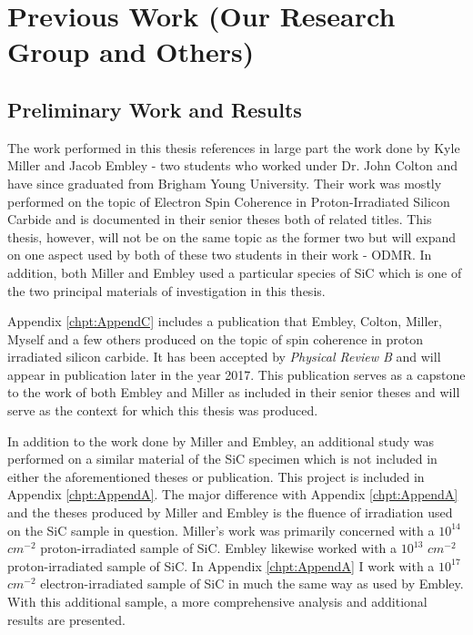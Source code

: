 \documentclass[oneside, astronomy, noacknowlegments]{BYUPhys}
\begin{document}
\section{Previous Work (Our Research Group and Others)}

\subsection{Preliminary Work and Results}

The work performed in this thesis references in large part the work done by Kyle Miller and Jacob Embley - two students who worked under Dr. John Colton and have since graduated from Brigham Young University. Their work was mostly performed on the topic of Electron Spin Coherence in Proton-Irradiated Silicon Carbide and is documented in their senior theses both of related titles. This thesis, however, will not be on the same topic as the former two but will expand on one aspect used by both of these two students in their work - ODMR. In addition, both Miller and Embley used a particular species of SiC which is one of the two principal materials of investigation in this thesis.

Appendix \ref{chpt:AppendC} includes a publication that Embley, Colton, Miller, Myself and a few others produced on the topic of spin coherence in proton irradiated silicon carbide. It has been accepted by \textit{Physical Review B} and will appear in publication later in the year 2017. This publication serves as a capstone to the work of both Embley and Miller as included in their senior theses and will serve as the context for which this thesis was produced.

In addition to the work done by Miller and Embley, an additional study was performed on a similar material of the SiC specimen which is not included in either the aforementioned theses or publication. This project is included in Appendix \ref{chpt:AppendA}. The major difference with Appendix \ref{chpt:AppendA} and the theses produced by Miller and Embley is the fluence of irradiation used on the SiC sample in question. Miller's work was primarily concerned with a $10^{14}$ $cm^{-2}$ proton-irradiated sample of SiC. Embley likewise worked with a $10^{13}$ $cm^{-2}$ proton-irradiated sample of SiC. In Appendix \ref{chpt:AppendA} I work with a $10^{17}$ $cm^{-2}$ electron-irradiated sample of SiC in much the same way as used by Embley. With this additional sample, a more comprehensive analysis and additional results are presented.
\end{document}
